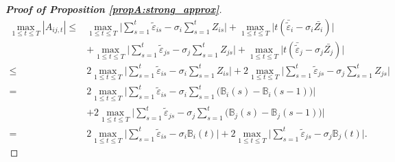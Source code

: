 \documentclass[a4paper,12pt]{article}
\begin{document}
\begin{proof}[\textnormal{\textbf{Proof of Proposition \ref{propA:strong_approx}}}]
\begin{align*}
\max_{1 \le t \le T} |A_{ij, t}|   \le & \max_{1 \le t \le T} \Big| \sum\limits_{s=1}^t \widetilde{\varepsilon}_{is} -{\sigma}_i \sum\limits_{s=1}^t Z_{is} \Big| + \max_{1 \le t \le T} \Big| t (\bar{\widetilde{\varepsilon}}_{i} - {\sigma}_i \bar{Z_i}) \Big|\\
& + \max_{1 \le t \le T} \Big| \sum\limits_{s=1}^t \widetilde{\varepsilon}_{js} - {\sigma}_j \sum\limits_{s=1}^t Z_{js} \Big| + \max_{1 \le t \le T} \Big| t (\bar{\widetilde{\varepsilon}}_{j} -{\sigma}_j \bar{Z_j}) \Big| \\
\le & 2 \max_{1 \le t \le T} \Big| \sum\limits_{s=1}^t \widetilde{\varepsilon}_{is} -{\sigma}_i \sum\limits_{s=1}^t Z_{is} \Big| + 2 \max_{1 \le t \le T} \Big| \sum\limits_{s=1}^t \widetilde{\varepsilon}_{js} -{\sigma}_j \sum\limits_{s=1}^t Z_{js} \Big| \\
= & 2 \max_{1 \le t \le T} \Big| \sum\limits_{s=1}^t \widetilde{\varepsilon}_{is} - {\sigma}_i \sum\limits_{s=1}^t \big(\mathbb{B}_{i}(s) - \mathbb{B}_{i}(s-1) \big) \Big| \\
& +  2 \max_{1 \le t \le T} \Big| \sum\limits_{s=1}^t \widetilde{\varepsilon}_{js} -{\sigma}_j \sum\limits_{s=1}^t \big(\mathbb{B}_{j}(s) - \mathbb{B}_{j}(s-1) \big) \Big|\\
= & 2 \max_{1 \le t \le T} \Big| \sum\limits_{s=1}^t \widetilde{\varepsilon}_{is} - {\sigma}_i \mathbb{B}_{i}(t) \Big| + 2 \max_{1 \le t \le T} \Big| \sum\limits_{s=1}^t \widetilde{\varepsilon}_{js} - {\sigma}_j \mathbb{B}_{j}(t) \Big|.
\end{align*}


\end{proof}
\end{document}
